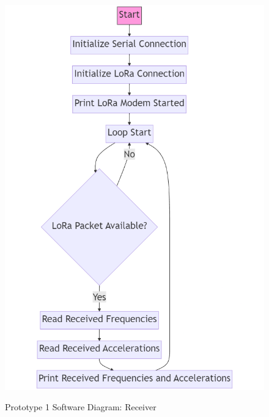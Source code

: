 \begin{figure}[H]
	\centering 
	\caption{Prototype 1 Software Diagram: Receiver}
	\includegraphics[width=\textwidth]{Sections/Design-Process/proto1-soft-diagram-receiver.png}
	\label{proto1-soft-diagram-receiver}
\end{figure}

